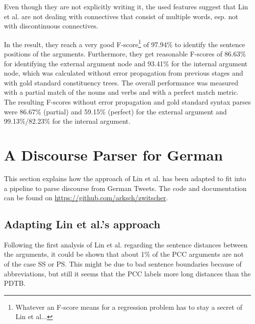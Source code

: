 \documentclass[10pt,a4paper]{article}
\begin{document}
Even though they are not explicitly writing it, the used features suggest that Lin et al. are not dealing with connectives that consist of multiple words, esp. not with discontinuous connectives.

In the result, they reach a very good F-score\footnote{Whatever an F-score means for a regression problem has to stay a secret of Lin et al...} of 97.94\% to identify the sentence positions of the arguments.
Furthermore, they get reasonable F-scores of 86.63\% for identifying the external argument node and 93.41\% for the internal argument node, which was calculated without error propagation from previous stages and with gold standard constituency trees.
The overall performance was measured with a partial match of the nouns and verbs and with a perfect match metric. The resulting F-scores without error propagation and gold standard syntax parses were 86.67\% (partial) and 59.15\% (perfect) for the external argument and 99.13\%/82.23\% for the internal argument.


\section{A Discourse Parser for German}

This section explains how the approach of Lin et al. has been adapted to fit into a pipeline to parse discourse from German Tweets. The code and documentation can be found on \url{https://github.com/arksch/zwitscher}.

\subsection{Adapting Lin et al.'s approach}

Following the first analysis of Lin et al. regarding the sentence distances between the arguments, it could be shown that about 1\% of the PCC arguments are not of the case SS or PS. This might be due to bad sentence boundaries because of abbreviations, but still it seems that the PCC labels more long distances than the PDTB.
\end{document}
